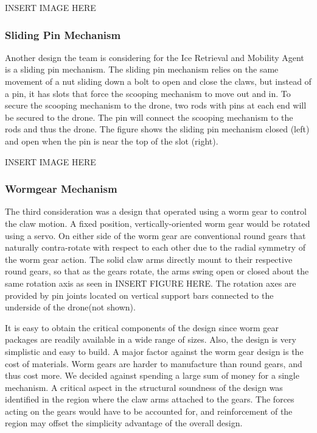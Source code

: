 			INSERT IMAGE HERE

		\subsubsection{Sliding Pin Mechanism}
			Another design the team is considering for the Ice Retrieval and Mobility Agent is a sliding pin mechanism. The sliding pin mechanism relies on the same movement of a nut sliding down a bolt to open and close the claws, but instead of a pin, it has slots that force the scooping mechanism to move out and in. To secure the scooping mechanism to the drone, two rods with pins at each end will be secured to the drone. The pin will connect the scooping mechanism to the rods and thus the drone. The figure shows the sliding pin mechanism closed (left) and open when the pin is near the top of the slot (right). 

			INSERT IMAGE HERE

		\subsubsection{Wormgear Mechanism}
			The third consideration was a design that operated using a worm gear to control the claw motion. A fixed position, vertically-oriented worm gear would be rotated using a servo. On either side of the worm gear are conventional round gears that naturally contra-rotate with respect to each other due to the radial symmetry of the worm gear action. The solid claw arms directly mount to their respective round gears, so that as the gears rotate, the arms swing open or closed about the same rotation axis as seen in INSERT FIGURE HERE. The rotation axes are provided by pin joints located on vertical support bars connected to the underside of the drone(not shown).

			It is easy to obtain the critical components of the design since worm gear packages are readily available in a wide range of sizes. Also, the design is very simplistic and easy to build. A major factor against the worm gear design is the cost of materials. Worm gears are harder to manufacture than round gears, and thus cost more. We decided against spending a large sum of money for a single mechanism. A critical aspect in the structural soundness of the design was identified in the region where the claw arms attached to the gears. The forces acting on the gears would have to be accounted for, and reinforcement of the region may offset the simplicity advantage of the overall design.
			
